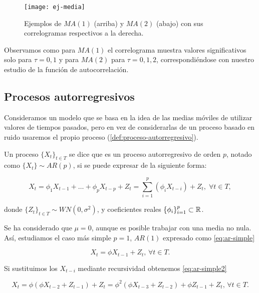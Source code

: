 \begin{figure}[htpb]
  \centering
  \texttt{[image: ej-media]}
  \caption{Ejemplos de $MA(1)$ (arriba) y $MA(2)$ (abajo) con sus correlogramas respectivos a la derecha.}
  \label{fig:ej-media}
\end{figure}

Observamos como para $MA(1)$ el correlograma muestra valores significativos solo para $\tau = 0, 1$ y para $MA(2)$ para $\tau = 0, 1, 2$, correspondiéndose con nuestro estudio de la función de autocorrelación.

\subsection{Procesos autorregresivos}

Consideramos un modelo que se basa en la idea de las medias móviles de utilizar valores de tiempos pasados, pero en vez de considerarlas de un proceso basado en ruido usaremos el propio proceso (\autoref{def:proceso-autorregresivo}).

\begin{definicion}
  Un proceso $\{X_t\}_{t \in T}$ se dice que es un proceso autorregresivo de orden $p$, notado como $\{X_t\} \sim AR(p)$, si se puede expresar de la siguiente forma:

  $$X_t = \phi_1 X_{t-1} + \ldots + \phi_p X_{t - p} + Z_t = \sum \limits^p_{i = 1} \left(\phi_i X_{t - i}\right) + Z_t, \; \forall t \in T,$$

  donde $\{Z_t\}_{t \in T} \sim WN(0, \sigma^2)$, y coeficientes reales $\{\phi_i\}_{i = 1}^p \subset \mathbb{R}$.
  \label{def:proceso-autorregresivo}
\end{definicion}

Se ha considerado que $\mu = 0$, aunque es posible trabajar con una media no nula. Así, estudiamos el caso más simple $p = 1$, $AR(1)$ expresado como \eqref{eq:ar-simple}

\begin{equation}
  X_t = \phi X_{t - 1} + Z_t, \, \forall t \in T.
  \label{eq:ar-simple}
\end{equation}

Si sustituimos los $X_{t - i}$ mediante recursividad obtenemos \eqref{eq:ar-simple2}

\begin{equation}
  X_t = \phi\left(\phi X_{t-2} + Z_{t-1}\right) + Z_t = \phi^2\left(\phi X_{t-3} + Z_{t-2}\right) + \phi Z_{t-1} + Z_t, \, \forall t \in T.
  \label{eq:ar-simple2}
\end{equation}

